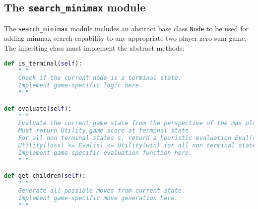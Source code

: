 \documentclass[a4paper]{article}
\begin{document}
\subsection{The \texttt{search\_minimax} module}
The \texttt{search\_minimax} module includes an abstract base class \texttt{Node} to be used for adding minmax search capability to any appropriate two-player zero-sum game. The inheriting class must implement the abstract methods:
\begin{lstlisting}[language=Python]
def is_terminal(self):
    """
    Check if the current node is a terminal state.
    Implement game-specific logic here.
    """

def evaluate(self):
    """
    Evaluate the current game state from the perspective of the max player.
    Must return Utility game score at terminal state.
    For all non terminal states s, return a heuristic evaluation Eval(s) of the board such that 
    Utility(loss) <= Eval(s) <= Utility(win) for all non terminal states s.
    Implement game-specific evaluation function here.
    """

def get_children(self):
    """
    Generate all possible moves from current state.
    Implement game-specific move generation here.
    """
\end{lstlisting}
\end{document}

